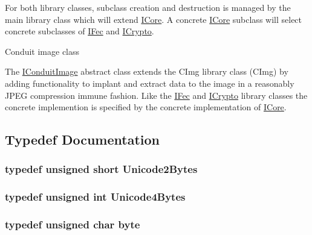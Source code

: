 For both library classes, subclass creation and destruction is managed by the main library class which will extend \hyperlink{classefb_1_1ICore}{ICore}. A concrete \hyperlink{classefb_1_1ICore}{ICore} subclass will select concrete subclasses of \hyperlink{classefb_1_1IFec}{IFec} and \hyperlink{classefb_1_1ICrypto}{ICrypto}.

\begin{DoxyParagraph}{Conduit image class}

\end{DoxyParagraph}
The \hyperlink{classefb_1_1IConduitImage}{IConduitImage} abstract class extends the CImg library class (CImg) by adding functionality to implant and extract data to the image in a reasonably JPEG compression immune fashion. Like the \hyperlink{classefb_1_1IFec}{IFec} and \hyperlink{classefb_1_1ICrypto}{ICrypto} library classes the concrete implemention is specified by the concrete implementation of \hyperlink{classefb_1_1ICore}{ICore}. 

\subsection{Typedef Documentation}
\hypertarget{namespaceefb_acce95f2192212162af47fde5af397bea}{
\subsubsection[{Unicode2Bytes}]{\setlength{\rightskip}{0pt plus 5cm}typedef unsigned short {\bf Unicode2Bytes}}}
\label{namespaceefb_acce95f2192212162af47fde5af397bea}
\hypertarget{namespaceefb_aa0d3cfad43f6f1a2056b87427ada3b74}{
\subsubsection[{Unicode4Bytes}]{\setlength{\rightskip}{0pt plus 5cm}typedef unsigned int {\bf Unicode4Bytes}}}
\label{namespaceefb_aa0d3cfad43f6f1a2056b87427ada3b74}
\hypertarget{namespaceefb_a0c8186d9b9b7880309c27230bbb5e69d}{
\subsubsection[{byte}]{\setlength{\rightskip}{0pt plus 5cm}typedef unsigned char {\bf byte}}}
\label{namespaceefb_a0c8186d9b9b7880309c27230bbb5e69d}
